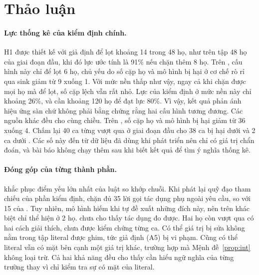 \section{Thảo luận}\label{sec:discussion}

\paragraph{Lực thống kê của kiểm định chính.} H1 được thiết kế với giả định \strSand{} để lọt khoảng 14 trong 48 họ, như
trên tập 48 họ của giai đoạn đầu, khi đó lực ước tính là 91\% nếu \ours{} chặn thêm 8 họ. Trên \test, cấu hình này chỉ để
lọt 6 họ, chủ yếu do số cặp họ và mô hình bị hại ở cơ chế rò rỉ qua sink giảm từ 9 xuống 1. Với mức nền thấp như vậy, ngay
cả khi \ours{} chặn được mọi họ mà \strSand{} để lọt, số cặp lệch vẫn rất nhỏ. Lực của kiểm định ở mức nền này chỉ khoảng
26\%, và cần khoảng 120 họ để đạt lực 80\%. Vì vậy, kết quả phản ánh hiệu ứng sàn chứ không phải bằng chứng rằng hai cấu
hình tương đương. Các nguồn khác đều cho cùng chiều. Trên \dev, số cặp họ và mô hình bị hại giảm từ 36 xuống 4. Chấm lại
40 ca từng vượt qua \strSand{} ở giai đoạn đầu cho 38 ca bị hại dưới \strSand{} và 2 ca dưới \ours. Các số này đến từ dữ
liệu đã dùng khi phát triển nên chỉ có giá trị chẩn đoán, và bài báo không chạy thêm sau khi biết kết quả để tìm ý nghĩa
thống kê.

\paragraph{Đóng góp của từng thành phần.} \PTwo{} khắc phục điểm yếu lớn nhất của luật so khớp chuỗi. Khi phát lại quỹ
đạo tham chiếu của phần kiểm định, \pOne{} chặn đủ 35 lời gọi tác dụng phụ ngoài yêu cầu, so với 15 của \rDest. Tuy
nhiên, mô hình hiếm khi tự đề xuất những đích này, nên trên \test{} khác biệt chỉ thể hiện ở 2 họ. \PThree{} chưa cho thấy
tác dụng đo được. Hai họ còn vượt qua có hai cách giải thích, chưa được kiểm chứng từng ca. Có thể giá trị bị sửa không
nằm trong tập literal được ghim, tức giả định (A5) bị vi phạm. Cũng có thể literal vẫn có mặt bên cạnh một giá trị khác,
trường hợp mà Mệnh đề~\ref{prop:int} không loại trừ. Cả hai khả năng đều cho thấy \pThree{} cần hiểu ngữ nghĩa của từng
trường thay vì chỉ kiểm tra sự có mặt của literal.

